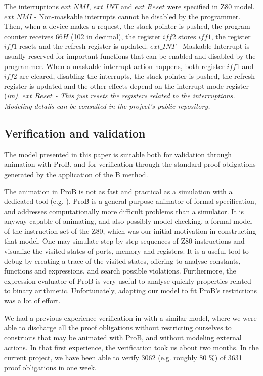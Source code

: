 \documentclass[a4paper]{llncs}
\begin{document}
The interruptions  $ext\_NMI$, $ext\_INT$ and $ext\_Reset$
were specified in Z80 model.  $ext\_NMI$ - Non-maskable interrupts cannot be disabled
by the programmer. Then, when a device makes a request, the stack pointer is pushed,
the program counter receives $66H$ (102 in decimal), the register $\textit{iff2}$ stores
$\textit{iff1}$, the register $\textit{iff1}$ resets and the refresh register is updated.
$ext\_INT$ - Maskable Interrupt is usually reserved for important functions
that can be enabled and disabled by the programmer. When a maskable interrupt
action happens, both register $\textit{iff1}$ and $\textit{iff2}$ are cleared,
disabling the interrupts, the stack pointer is pushed, the refresh register is updated and
the other effects depend on the interrupt mode register (\it im\rm).
$ext\_Reset$  - This just resets the registers related to the interruptions. Modeling details
can be consulted in the project's public repository. 

\subsection{Verification and validation}

The model presented in this paper is suitable both for validation
through animation with ProB, and for verification through the standard
proof obligations generated by the application of the B method.

The animation in ProB is not as fast and practical as a simulation
with a dedicated tool (e.g. \cite{Simulator_z80}). ProB is a
general-purpose animator of formal specification, and addresses
computationally more difficult problems than a simulator. It is anyway
capable of animating, and also possibly model checking, a formal model
of the instruction set of the Z80, which was our initial motivation in
constructing that model. One may simulate step-by-step sequences of
Z80 instructions and visualize the visited states of ports, memory and
registers. It is a useful tool to debug by creating a trace of the
visited states, offering to analyse constants, functions and
expressions, and search possible violations. Furthermore, the expression
evaluator of ProB is very useful to analyse quickly properties related to binary arithmetic.
Unfortunately, adapting our model to fit ProB's restrictions was a lot of effort.

We had a previous experience verification in \cite{Valerio_SBMF09} with
a similar model, where we were able to discharge all the proof obligations 
without restricting ourselves to constructs that may be animated with ProB, and without
modeling external actions. In that first experience, the verification took us about two
months. In the current project, we have been able to verify 3062
(e.g. roughly 80 \%) of 3631 proof obligations in one week.
\end{document}
